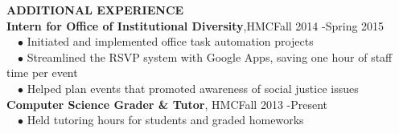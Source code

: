 \documentclass[11pt]{article}
\newcommand{\sectionNL}{\\[-2pt]}
\newcommand{\customtab}{$\hspace{10pt} \bullet \hspace{2pt}$}
\newcommand{\customtabinline}{$\hspace{23pt}$}
\newcommand{\HMC}{HMC}
\newcommand{\rightAlign}{\hfill}
\begin{document}
\begin{flushleft}
{\textbf{ADDITIONAL EXPERIENCE } } \sectionNL
\textbf{Intern for Office of Institutional Diversity},\HMC \rightAlign Fall 2014 -Spring 2015 \\
\customtab Initiated and implemented office task automation projects\\
\customtab Streamlined the RSVP system with Google Apps, saving one hour of staff time per event  \\
\customtab Helped plan events that promoted awareness of social justice issues \\

\textbf{Computer Science Grader \& Tutor}, \HMC \rightAlign Fall 2013 -Present \\ %
\customtab Held tutoring hours for students and graded homeworks

\end{flushleft}
\end{document}
